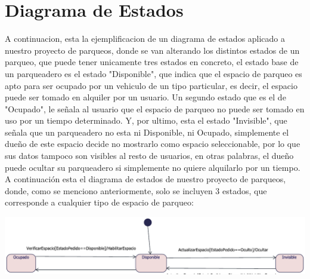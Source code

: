 \section{Diagrama de Estados}
\begin{flushleft}
A continuacion, esta la ejemplificacion de un diagrama de estados aplicado a nuestro proyecto de parqueos, donde se van alterando los distintos estados de un parqueo, que puede tener unicamente tres estados en concreto, el estado base de un parqueadero es el estado "Disponible", que indica que el espacio de parqueo es apto para ser ocupado por un vehiculo de un tipo particular, es decir, el espacio puede ser tomado en alquiler por un usuario. Un segundo estado que es el de "Ocupado", le señala al usuario que el espacio de parqueo no puede ser tomado en uso por un tiempo determinado. Y, por ultimo, esta el estado "Invisible", que señala que un parqueadero no esta ni Disponible, ni Ocupado, simplemente el dueño de este espacio decide no mostrarlo como espacio seleccionable, por lo que sus datos tampoco son visibles al resto de usuarios, en otras palabras, el dueño puede ocultar su parqueadero si simplemente no quiere alquilarlo por un tiempo.
\\
A continuación esta el diagrama de estados de nuestro proyecto de parqueos, donde, como se menciono anteriormente, solo se incluyen 3 estados, que corresponde a cualquier tipo de espacio de parqueo:
\\
\begin{center}
{\includegraphics[width=1.18\linewidth]{imgs/Imagenes - Diagrama de estados/Estados}}
\end{center}

\end{flushleft}
\newpage
